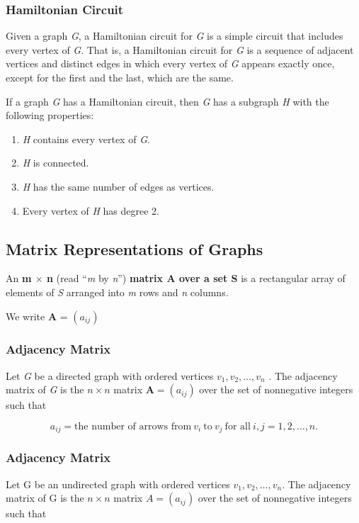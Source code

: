 \documentclass{article}
\begin{document}
\subsubsection{Hamiltonian Circuit}
Given a graph \textit{G}, a Hamiltonian circuit for \textit{G} is a simple circuit that includes every vertex of \textit{G}. That is, a Hamiltonian circuit for \textit{G} is a sequence of adjacent vertices and distinct edges in which every vertex of \textit{G} appears exactly once, except for the first and the last, which are the same.

If a graph \textit{G} has a Hamiltonian circuit, then \textit{G} has a subgraph \textit{H} with the following properties:

\begin{enumerate}
\item \textit{H} contains every vertex of \textit{G}.
\item \textit{H} is connected.
\item \textit{H} has the same number of edges as vertices.
\item Every vertex of \textit{H} has degree 2.
\end{enumerate}


\subsection{Matrix Representations of Graphs}
An \textbf{m $\times$ n} (read “\textit{m} by \textit{n}”) \textbf{matrix A over a set S} is a rectangular array of elements of \textit{S} arranged into \textit{m} rows and \textit{n} columns.

We write \textbf{A} = $(a_{ij})$

\subsubsection{Adjacency Matrix}
Let \textit{G} be a directed graph with ordered vertices $v_1, v_2, \ldots , v_n$ . The adjacency matrix of \textit{G} is the $n \times n$ matrix $\textbf{A} = ( a_{ij} )$ over the set of nonnegative integers such that

\begin{equation}
a_{ij} = \text{the number of arrows from} \ v_i \ \text{to} \ v_j \ \text{for all} \ i, j = 1, 2, \ldots, n.
\end{equation}

\subsubsection{Adjacency Matrix}
Let G be an undirected graph with ordered vertices $v_1, v_2, \ldots,v_n$. The adjacency matrix of G is the $n \times n$ matrix $A = ( a_{ij} )$ over the set of nonnegative integers such that
\end{document}
